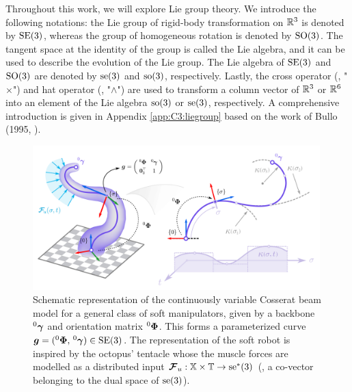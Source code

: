 Throughout this work, we will explore Lie group theory. We introduce the following notations: the Lie group of rigid-body transformation on $\mathbb{R}^3$ is denoted by $\textup{\textrm{SE}}(3)$, whereas the group of homogeneous rotation is denoted by $\textup{\textrm{SO}}(3)$. The tangent space at the identity of the group is called the Lie algebra, and it can be used to describe the evolution of the Lie group. The Lie algebra of $\textup{\textrm{SE}}(3)$ and $\textup{\textrm{SO}}(3)$ are denoted by $\textup{\textrm{se}}(3)$ and $\textup{\textrm{so}}(3)$, respectively. Lastly, the cross operator (\ie, "$\times$") and hat operator (\ie, "$\wedge$") are used to transform a column vector of $\mathbb{R}^3$ or $\mathbb{R}^6$ into an element of the Lie algebra $\textup{\textrm{so}}(3)$ or $\textup{\textrm{se}}(3)$, respectively. A comprehensive introduction is given in Appendix \ref{app:C3:liegroup} based on the work of Bullo (1995, \cite{Bullo1995}). 
%
%
\begin{figure}[!t]
  \vspace{-2mm}
  \centering
 \includegraphics[width = 0.99\textwidth]{3_chapters/3_chapter/img/fig_C3_schematic.pdf}
  \caption{Schematic representation of the continuously variable Cosserat beam model for a general class of soft manipulators, given by a backbone $^0 {\boldsymbol{\gamma}}$ and orientation matrix $^0 {\boldsymbol{\Phi}}$. This forms a parameterized curve ${\boldsymbol{g}} = (^0 {\boldsymbol{\Phi}},\,^0{\boldsymbol{\gamma}}) \in \textup{\textrm{SE}}(3)$. The representation of the soft robot is inspired by the octopus' tentacle whose the muscle forces are modelled as a distributed input ${\boldsymbol{\mathcal{F}}}_u: \mathbb{X} \times \mathbb{T} \to \textup{\textrm{se}}^*(3)$ (\ie, a co-vector belonging to the dual space of $\textup{\textrm{se}}(3)$). \label{fig:C3:example1}}
  \vspace{-0.4cm}
\end{figure}
%
